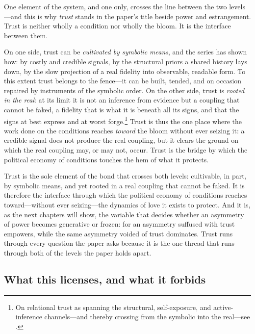 One element of the system, and one only, crosses the line between the two levels---and this is why \emph{trust} stands in the paper's title beside power and estrangement. Trust is neither wholly a condition nor wholly the bloom. It is the interface between them.

On one side, trust can be \emph{cultivated by symbolic means}, and the series has shown how: by costly and credible signals, by the structural priors a shared history lays down, by the slow projection of a real fidelity into observable, readable form. To this extent trust belongs to the fence---it can be built, tended, and on occasion repaired by instruments of the symbolic order. On the other side, trust is \emph{rooted in the real}: at its limit it is not an inference from evidence but a coupling that cannot be faked, a fidelity that is what it is beneath all its signs, and that the signs at best express and at worst forge.\footnote{On relational trust as spanning the structural, self-exposure, and active-inference channels---and thereby crossing from the symbolic into the real---see \textcite{paperxiii}.} Trust is thus the one place where the work done on the conditions reaches \emph{toward} the bloom without ever seizing it: a credible signal does not produce the real coupling, but it clears the ground on which the real coupling may, or may not, occur. Trust is the bridge by which the political economy of conditions touches the hem of what it protects.

\begin{claim}
Trust is the sole element of the bond that crosses both levels: cultivable, in part, by symbolic means, and yet rooted in a real coupling that cannot be faked. It is therefore the interface through which the political economy of conditions reaches toward---without ever seizing---the dynamics of love it exists to protect. And it is, as the next chapters will show, the variable that decides whether an asymmetry of power becomes generative or frozen: for an asymmetry suffused with trust empowers, while the same asymmetry voided of trust dominates. Trust runs through every question the paper asks because it is the one thread that runs through both of the levels the paper holds apart.
\end{claim}

\subsection{What this licenses, and what it forbids}
\label{p17:sub:conditions-license}


